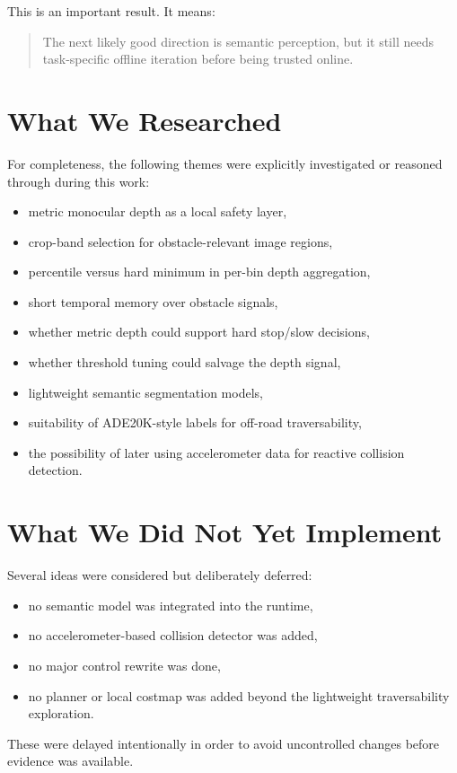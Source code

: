 \documentclass[11pt]{article}
\begin{document}
This is an important result. It means:
\begin{quote}
The next likely good direction is semantic perception, but it still needs task-specific offline iteration before being trusted online.
\end{quote}

\section{What We Researched}
For completeness, the following themes were explicitly investigated or reasoned through during this work:
\begin{itemize}[leftmargin=*]
\item metric monocular depth as a local safety layer,
\item crop-band selection for obstacle-relevant image regions,
\item percentile versus hard minimum in per-bin depth aggregation,
\item short temporal memory over obstacle signals,
\item whether metric depth could support hard stop/slow decisions,
\item whether threshold tuning could salvage the depth signal,
\item lightweight semantic segmentation models,
\item suitability of ADE20K-style labels for off-road traversability,
\item the possibility of later using accelerometer data for reactive collision detection.
\end{itemize}

\section{What We Did Not Yet Implement}
Several ideas were considered but deliberately deferred:
\begin{itemize}[leftmargin=*]
\item no semantic model was integrated into the runtime,
\item no accelerometer-based collision detector was added,
\item no major control rewrite was done,
\item no planner or local costmap was added beyond the lightweight traversability exploration.
\end{itemize}

These were delayed intentionally in order to avoid uncontrolled changes before evidence was available.
\end{document}
